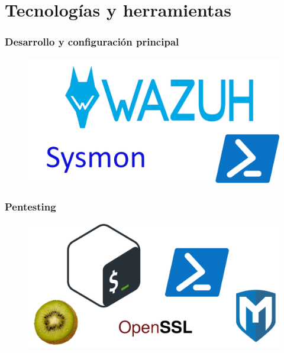 \documentclass[a4paper,10pt]{beamer}
\begin{document}
\section{Tecnologías y herramientas}
\begin{frame}[fragile]
	\frametitle{Desarrollo y configuración principal}

	\begin{figure}[H]
		\centering
		\includegraphics[width=\textwidth]{figuras/TH_principal.png}
	\end{figure}
\end{frame}

\begin{frame}[fragile]
	\frametitle{Pentesting}

	\begin{figure}[H]
		\centering
		\includegraphics[width=\textwidth]{figuras/TH_pentesting.png}
	\end{figure}
\end{frame}
\end{document}
